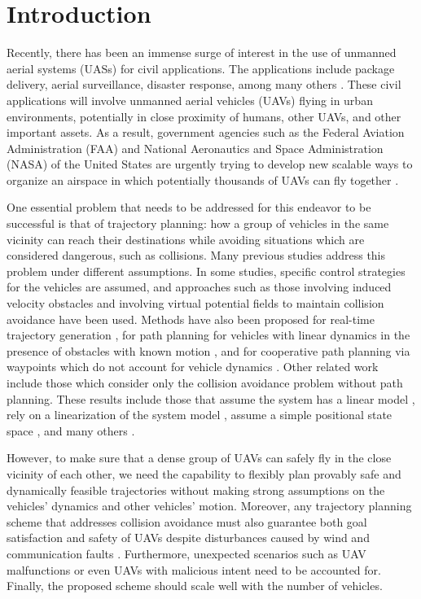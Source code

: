 \section{Introduction \label{sec:introduction}}
Recently, there has been an immense surge of interest in the use of unmanned aerial systems (UASs) for civil applications. The applications include package delivery, aerial surveillance, disaster response, among many others \cite{Tice91, Debusk10, Amazon16, AUVSI16, BBC16}. These civil applications will involve unmanned aerial vehicles (UAVs) flying in urban environments, potentially in close proximity of humans, other UAVs, and other important assets. As a result, government agencies such as the Federal Aviation Administration (FAA) and National Aeronautics and Space Administration (NASA) of the United States are urgently trying to develop new scalable ways to organize an airspace in which potentially thousands of UAVs can fly together \cite{FAA13, Kopardekar16}.

One essential problem that needs to be addressed for this endeavor to be successful is that of trajectory planning: how a group of vehicles in the same vicinity can reach their destinations while avoiding situations which are considered dangerous, such as collisions. Many previous studies address this problem under different assumptions. In some studies, specific control strategies for the vehicles are assumed, and approaches such as those involving induced velocity obstacles \cite{Fiorini98, Chasparis05, Vandenberg08,Wu2012} and involving virtual potential fields to maintain collision avoidance \cite{Olfati-Saber2002, Chuang07} have been used. Methods have also been proposed for real-time trajectory generation \cite{Feng-LiLian2002}, for path planning for vehicles with linear dynamics in the presence of obstacles with known motion \cite{Ahmadzadeh2009}, and for cooperative path planning via waypoints which do not account for vehicle dynamics \cite{Bellingham}. Other related work include those which consider only the collision avoidance problem without path planning. These results include those that assume the system has a linear model \cite{Beard2003, Schouwenaars2004, Stipanovic2007}, rely on a linearization of the system model \cite{Massink2001, Althoff2011}, assume a simple positional state space \cite{Lin2015}, and many others \cite{Lalish2008, Hoffmann2008, Chen2016}.

However, to make sure that a dense group of UAVs can safely fly in the close vicinity of each other, we need the capability to flexibly plan provably safe and dynamically feasible trajectories without making strong assumptions on the vehicles' dynamics and other vehicles' motion. Moreover, any trajectory planning scheme that addresses collision avoidance must also guarantee both goal satisfaction and safety of UAVs despite disturbances caused by wind and communication faults \cite{Kopardekar16}. Furthermore, unexpected scenarios such as UAV malfunctions or even UAVs with malicious intent need to be accounted for. Finally, the proposed scheme should scale well with the number of vehicles.

